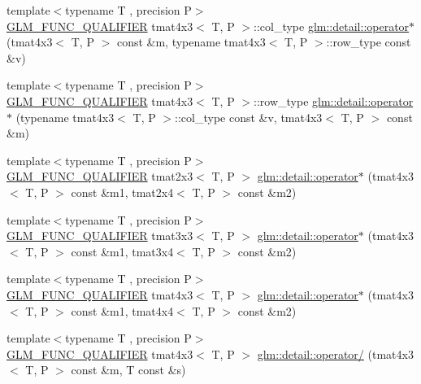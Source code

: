 \begin{DoxyCompactItemize}
\item 
{\footnotesize template$<$typename T , precision P$>$ }\\\hyperlink{setup_8hpp_a33fdea6f91c5f834105f7415e2a64407}{G\+L\+M\+\_\+\+F\+U\+N\+C\+\_\+\+Q\+U\+A\+L\+I\+F\+I\+ER} tmat4x3$<$ T, P $>$\+::col\+\_\+type \hyperlink{namespaceglm_1_1detail_a37441f776205cc26bc865515f55b2b09}{glm\+::detail\+::operator$\ast$} (tmat4x3$<$ T, P $>$ const \&m, typename tmat4x3$<$ T, P $>$\+::row\+\_\+type const \&v)
\item 
{\footnotesize template$<$typename T , precision P$>$ }\\\hyperlink{setup_8hpp_a33fdea6f91c5f834105f7415e2a64407}{G\+L\+M\+\_\+\+F\+U\+N\+C\+\_\+\+Q\+U\+A\+L\+I\+F\+I\+ER} tmat4x3$<$ T, P $>$\+::row\+\_\+type \hyperlink{namespaceglm_1_1detail_aea1c00212cf72a920e12251eb835166c}{glm\+::detail\+::operator$\ast$} (typename tmat4x3$<$ T, P $>$\+::col\+\_\+type const \&v, tmat4x3$<$ T, P $>$ const \&m)
\item 
{\footnotesize template$<$typename T , precision P$>$ }\\\hyperlink{setup_8hpp_a33fdea6f91c5f834105f7415e2a64407}{G\+L\+M\+\_\+\+F\+U\+N\+C\+\_\+\+Q\+U\+A\+L\+I\+F\+I\+ER} tmat2x3$<$ T, P $>$ \hyperlink{namespaceglm_1_1detail_a9431a7f60753c05c81523028ccbc98d3}{glm\+::detail\+::operator$\ast$} (tmat4x3$<$ T, P $>$ const \&m1, tmat2x4$<$ T, P $>$ const \&m2)
\item 
{\footnotesize template$<$typename T , precision P$>$ }\\\hyperlink{setup_8hpp_a33fdea6f91c5f834105f7415e2a64407}{G\+L\+M\+\_\+\+F\+U\+N\+C\+\_\+\+Q\+U\+A\+L\+I\+F\+I\+ER} tmat3x3$<$ T, P $>$ \hyperlink{namespaceglm_1_1detail_a30ab2e31fe87d36a74ff3996bc7e11d8}{glm\+::detail\+::operator$\ast$} (tmat4x3$<$ T, P $>$ const \&m1, tmat3x4$<$ T, P $>$ const \&m2)
\item 
{\footnotesize template$<$typename T , precision P$>$ }\\\hyperlink{setup_8hpp_a33fdea6f91c5f834105f7415e2a64407}{G\+L\+M\+\_\+\+F\+U\+N\+C\+\_\+\+Q\+U\+A\+L\+I\+F\+I\+ER} tmat4x3$<$ T, P $>$ \hyperlink{namespaceglm_1_1detail_a6017cbd409857efb0de47d33e1182735}{glm\+::detail\+::operator$\ast$} (tmat4x3$<$ T, P $>$ const \&m1, tmat4x4$<$ T, P $>$ const \&m2)
\item 
{\footnotesize template$<$typename T , precision P$>$ }\\\hyperlink{setup_8hpp_a33fdea6f91c5f834105f7415e2a64407}{G\+L\+M\+\_\+\+F\+U\+N\+C\+\_\+\+Q\+U\+A\+L\+I\+F\+I\+ER} tmat4x3$<$ T, P $>$ \hyperlink{namespaceglm_1_1detail_a700eca56e0edaea7d9e986e9498e6d9b}{glm\+::detail\+::operator/} (tmat4x3$<$ T, P $>$ const \&m, T const \&s)

\end{DoxyCompactItemize}
